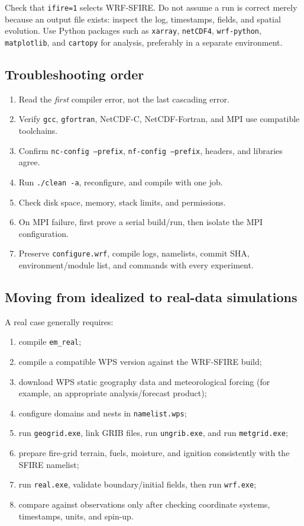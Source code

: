 \documentclass[11pt]{article}
\begin{document}
Check that \texttt{ifire=1} selects WRF-SFIRE. Do not assume a run is correct merely because an output file exists: inspect the log, timestamps, fields, and spatial evolution. Use Python packages such as \texttt{xarray}, \texttt{netCDF4}, \texttt{wrf-python}, \texttt{matplotlib}, and \texttt{cartopy} for analysis, preferably in a separate environment.

\subsection{Troubleshooting order}

\begin{enumerate}
  \item Read the \emph{first} compiler error, not the last cascading error.
  \item Verify \texttt{gcc}, \texttt{gfortran}, NetCDF-C, NetCDF-Fortran, and MPI use compatible toolchains.
  \item Confirm \texttt{nc-config --prefix}, \texttt{nf-config --prefix}, headers, and libraries agree.
  \item Run \texttt{./clean -a}, reconfigure, and compile with one job.
  \item Check disk space, memory, stack limits, and permissions.
  \item On MPI failure, first prove a serial build/run, then isolate the MPI configuration.
  \item Preserve \texttt{configure.wrf}, compile logs, namelists, commit SHA, environment/module list, and commands with every experiment.
\end{enumerate}

\subsection{Moving from idealized to real-data simulations}

A real case generally requires:
\begin{enumerate}
  \item compile \texttt{em\_real};
  \item compile a compatible WPS version against the WRF-SFIRE build;
  \item download WPS static geography data and meteorological forcing (for example, an appropriate analysis/forecast product);
  \item configure domains and nests in \texttt{namelist.wps};
  \item run \texttt{geogrid.exe}, link GRIB files, run \texttt{ungrib.exe}, and run \texttt{metgrid.exe};
  \item prepare fire-grid terrain, fuels, moisture, and ignition consistently with the SFIRE namelist;
  \item run \texttt{real.exe}, validate boundary/initial fields, then run \texttt{wrf.exe};
  \item compare against observations only after checking coordinate systems, timestamps, units, and spin-up.
\end{enumerate}
\end{document}
